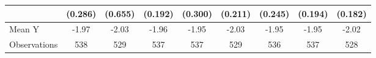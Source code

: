 {\begin{tabular}{l*{8}{c}}
            &     (0.286)         &     (0.655)         &     (0.192)         &     (0.300)         &     (0.211)         &     (0.245)         &     (0.194)         &     (0.182)         \\
\midrule
Mean Y      &       -1.97         &       -2.03         &       -1.96         &       -1.95         &       -2.03         &       -1.95         &       -1.95         &       -2.02         \\
Observations&         538         &         529         &         537         &         537         &         529         &         536         &         537         &         528         \\
\bottomrule
\end{tabular}
}
